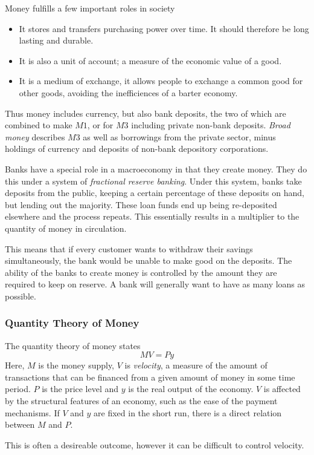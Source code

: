 \documentclass[12pt]{report}
\begin{document}
\begin{flushleft}
Money fulfills a few important roles in society
\begin{itemize}
    \item It stores and transfers purchasing power over time. It should
        therefore be long lasting and durable.
    \item It is also a unit of account; a measure of the economic value of a
        good.
    \item It is a medium of exchange, it allows people to exchange a common
        good for other goods, avoiding the inefficiences of a barter economy.
\end{itemize}
Thus money includes currency, but also bank deposits, the two of which are
combined to make \(M1\), or for \(M3\) including private non-bank deposits.
\textit{Broad money} describes \(M3\) as well as borrowings from the private
sector, minus holdings of currency and deposits of non-bank depository
corporations. \par
Banks have a special role in a macroeconomy in that they create money. They
do this under a system of \textit{fractional reserve banking}. Under this
system, banks take deposits from the public, keeping a certain percentage of
these deposits on hand, but lending out the majority. These loan funds end up
being re-deposited elsewhere and the process repeats. This essentially results
in a multiplier to the quantity of money in circulation. \par
This means that if every customer wants to withdraw their savings
simultaneously, the bank would be unable to make good on the deposits. The
ability of the banks to create money is controlled by the amount they are
required to keep on reserve. A bank will generally want to have as many loans
as possible.

\subsubsection*{Quantity Theory of Money}

The quantity theory of money states
\[MV = Py\]
Here, \(M\) is the money supply, \(V\) is \textit{velocity}, a measure of the
amount of transactions that can be financed from a given amount of money in
some time period. \(P\) is the price level and \(y\) is the real output of the
economy. \(V\) is affected by the structural features of an economy, such as
the ease of the payment mechanisms. If \(V\) and \(y\) are fixed in the short
run, there is a direct relation between \(M\) and \(P\). \par
This is often a desireable outcome, however it can be difficult to control
velocity.


\end{flushleft}
\end{document}
